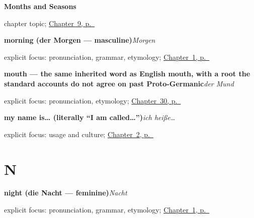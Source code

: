 \noindent\begin{minipage}[t]{\linewidth}
\raggedright
\textbf{Months and Seasons}\par
\footnotesize chapter topic; \hyperref[ch:months-seasons]{Chapter~9, p.~\pageref*{ch:months-seasons}}
\end{minipage}\par\smallskip

\noindent\begin{minipage}[t]{\linewidth}
\raggedright
\textbf{morning (der Morgen — masculine)}\enspace\emph{Morgen}\par
\footnotesize explicit focus: pronunciation, grammar, etymology; \hyperref[ch:greetings]{Chapter~1, p.~\pageref*{ch:greetings}}
\end{minipage}\par\smallskip

\noindent\begin{minipage}[t]{\linewidth}
\raggedright
\textbf{mouth — the same inherited word as English mouth, with a root the standard accounts do not agree on past Proto-Germanic}\enspace\emph{der Mund}\par
\footnotesize explicit focus: pronunciation, etymology; \hyperref[ch:ge-face-parts]{Chapter~30, p.~\pageref*{ch:ge-face-parts}}
\end{minipage}\par\smallskip

\noindent\begin{minipage}[t]{\linewidth}
\raggedright
\textbf{my name is… (literally \textquotedblleft{}I am called…\textquotedblright{})}\enspace\emph{ich heiße…}\par
\footnotesize explicit focus: usage and culture; \hyperref[ch:introductions]{Chapter~2, p.~\pageref*{ch:introductions}}
\end{minipage}\par\smallskip

\section*{N}

\noindent\begin{minipage}[t]{\linewidth}
\raggedright
\textbf{night (die Nacht — feminine)}\enspace\emph{Nacht}\par
\footnotesize explicit focus: pronunciation, grammar, etymology; \hyperref[ch:greetings]{Chapter~1, p.~\pageref*{ch:greetings}}
\end{minipage}\par\smallskip

